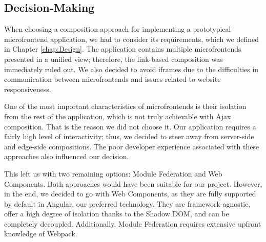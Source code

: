 \subsection{Decision-Making}
When choosing a composition approach for implementing a prototypical microfrontend application, we had to consider its requirements, which we defined in Chapter \ref{chap:Design}. The application contains multiple microfrontends presented in a unified view; therefore, the link-based composition was immediately ruled out. We also decided to avoid iframes due to the difficulties in communication between microfrontends and issues related to website responsiveness.

One of the most important characteristics of microfrontends is their isolation from the rest of the application, which is not truly achievable with Ajax composition. That is the reason we did not choose it. Our application requires a fairly high level of interactivity; thus, we decided to steer away from server-side and edge-side compositions. The poor developer experience associated with these approaches also influenced our decision.

This left us with two remaining options: Module Federation and Web Components. Both approaches would have been suitable for our project. However, in the end, we decided to go with Web Components, as they are fully supported by default in Angular, our preferred technology. They are framework-agnostic, offer a high degree of isolation thanks to the Shadow DOM, and can be completely decoupled. Additionally, Module Federation requires extensive upfront knowledge of Webpack.